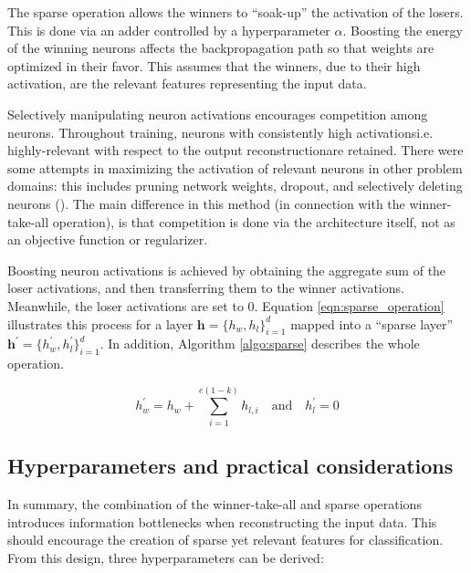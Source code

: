 \par The sparse operation allows the winners to ``soak-up'' the activation of
the losers. This is done via an adder controlled by a hyperparameter
$\alpha$. Boosting the energy of the winning neurons affects the
backpropagation path so that weights are optimized in their favor. This
assumes that the winners, due to their high activation, are the relevant
features representing the input data.

\par Selectively manipulating neuron activations encourages competition among
neurons. Throughout training, neurons with consistently high
activations\textemdash i.e. highly-relevant with respect to the output
reconstruction\textemdash are retained. There were some attempts in
maximizing the activation of relevant neurons in other problem
domains: this includes pruning network weights, dropout, and selectively
deleting neurons (\cite{louizos2017learning, chen2017kate, theis2018faster}).
The main difference in this method (in connection with the winner-take-all
operation), is that competition is done via the architecture itself, not as
an objective function or regularizer.

\par Boosting neuron activations is achieved by obtaining the aggregate sum
of the loser activations, and then transferring them to the winner
activations. Meanwhile, the loser activations are set to $0$. Equation
\ref{eqn:sparse_operation} illustrates this process for a layer $\mathbf{h} =
\{h_{w}, h_{l}\}_{i=1}^{d}$ mapped into a ``sparse layer''
$\mathbf{h}^{\prime} = \{h^{\prime}_w, h^{\prime}_l\}_{i=1}^{d}$. In
addition, Algorithm \ref{algo:sparse} describes the whole operation.

\begin{equation}
  \label{eqn:sparse_operation}
  h^{\prime}_{w} = h_{w} + \sum_{i=1}^{e(1-k)}h_{l,i} \quad \text{and} \quad h^{\prime}_l = 0 
\end{equation}



\subsection{Hyperparameters and practical considerations}

\par In summary, the combination of the winner-take-all and sparse operations
introduces information bottlenecks when reconstructing the input data. This
should encourage the creation of sparse yet relevant features for
classification. From this design, three hyperparameters can be derived:


